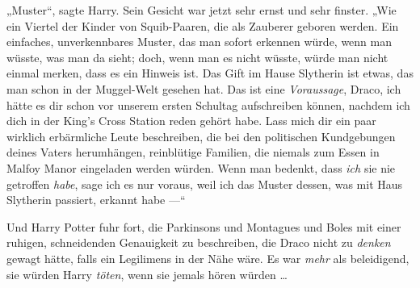 „Muster“, sagte Harry. Sein Gesicht war jetzt sehr ernst und sehr finster.
„Wie ein Viertel der Kinder von Squib-Paaren, die als Zauberer geboren werden. Ein einfaches, unverkennbares Muster, das man sofort erkennen würde, wenn man wüsste, was man da sieht; doch, wenn man es nicht wüsste, würde man nicht einmal merken, dass es ein Hinweis ist. Das Gift im Hause Slytherin ist etwas, das man schon in der Muggel-Welt gesehen hat. Das ist eine \emph{Voraussage}, Draco, ich hätte es dir schon vor unserem ersten Schultag aufschreiben können, nachdem ich dich in der King’s Cross Station reden gehört habe. Lass mich dir ein paar wirklich erbärmliche Leute beschreiben, die bei den politischen Kundgebungen deines Vaters herumhängen, reinblütige Familien, die niemals zum Essen in Malfoy Manor eingeladen werden würden. Wenn man bedenkt, dass \emph{ich} sie nie getroffen \emph{habe}, sage ich es nur voraus, weil ich das Muster dessen, was mit Haus Slytherin passiert, erkannt habe —“

Und Harry Potter fuhr fort, die Parkinsons und Montagues und Boles mit einer ruhigen, schneidenden Genauigkeit zu beschreiben, die Draco nicht zu \emph{denken} gewagt hätte, falls ein Legilimens in der Nähe wäre. Es war \emph{mehr} als beleidigend, sie würden Harry \emph{töten}, wenn sie jemals hören würden …

